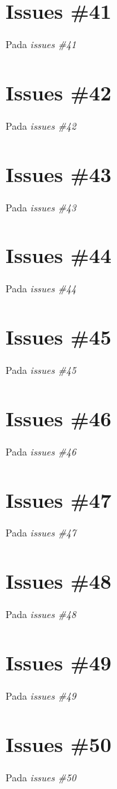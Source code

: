 \section{Issues \#41}
Pada \textit{issues \#41}

\section{Issues \#42}
Pada \textit{issues \#42}

\section{Issues \#43}
Pada \textit{issues \#43}

\section{Issues \#44}
Pada \textit{issues \#44}

\section{Issues \#45}
Pada \textit{issues \#45}

\section{Issues \#46}
Pada \textit{issues \#46}

\section{Issues \#47}
Pada \textit{issues \#47}

\section{Issues \#48}
Pada \textit{issues \#48}

\section{Issues \#49}
Pada \textit{issues \#49}

\section{Issues \#50}
Pada \textit{issues \#50}